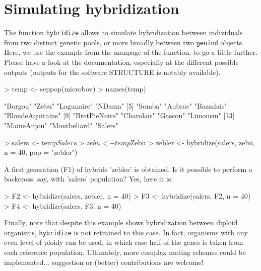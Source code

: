 \documentclass{article}
\begin{document}
\section{Simulating hybridization}
The function \texttt{hybridize} allows to simulate hybridization between
individuals from two distinct genetic pools, or more broadly between
two \texttt{genind} objects.
Here, we use the example from the manpage of the function, to go a
little further.
Please have a look at the documentation, especially at the different
possible outputs (outputs for the software STRUCTURE is notably available).
\begin{Schunk}
\begin{Sinput}
> temp <- seppop(microbov)
> names(temp)
\end{Sinput}
\begin{Soutput}
 [1] "Borgou"          "Zebu"            "Lagunaire"       "NDama"          
 [5] "Somba"           "Aubrac"          "Bazadais"        "BlondeAquitaine"
 [9] "BretPieNoire"    "Charolais"       "Gascon"          "Limousin"       
[13] "MaineAnjou"      "Montbeliard"     "Salers"         
\end{Soutput}
\begin{Sinput}
> salers <- temp$Salers
> zebu <- temp$Zebu
> zebler <- hybridize(salers, zebu, n = 40, pop = "zebler")
\end{Sinput}
\end{Schunk}

\noindent A first generation (F1) of hybrids 'zebler' is obtained.
Is it possible to perform a backcross, say, with 'salers' population?
Yes, here it is:
\begin{Schunk}
\begin{Sinput}
> F2 <- hybridize(salers, zebler, n = 40)
> F3 <- hybridize(salers, F2, n = 40)
> F4 <- hybridize(salers, F3, n = 40)
\end{Sinput}
\end{Schunk}
Finally, note that despite this example shows hybridization between
diploid organisms, \texttt{hybridize} is not retrained to this case.
In fact, organisms with any even level of ploidy can be used, in which
case half of the genes is taken from each reference population.
Ultimately, more complex mating schemes could be
implemented... suggestion or (better) contributions are welcome!
\end{document}
